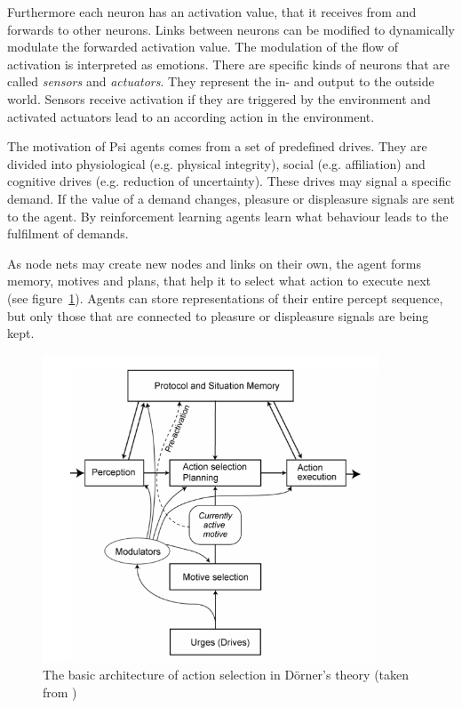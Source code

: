 Furthermore each neuron has an activation value, that it receives from and forwards to other neurons. Links between neurons can be modified to dynamically modulate the forwarded activation value. The modulation of the flow of activation is interpreted as emotions. There are specific kinds of neurons that are called \emph{sensors} and \emph{actuators}. They represent the in- and output to the outside world. Sensors receive activation if they are triggered by the environment and activated actuators lead to an according action in the environment.

The motivation of Psi agents comes from a set of predefined drives. They are divided into physiological (e.g. physical integrity), social (e.g. affiliation) and cognitive drives (e.g. reduction of uncertainty). These drives may signal a specific demand. If the value of a demand changes, pleasure or displeasure signals are sent to the agent. By reinforcement learning agents learn what behaviour leads to the fulfilment of demands. 

As node nets may create new nodes and links on their own, the agent forms memory, motives and plans, that help it to select what action to execute next (see figure~\ref{motive_architecture}). Agents can store representations of their entire percept sequence, but only those that are connected to pleasure or displeasure signals are being kept.

\begin{figure}[h]
  \centering
    \includegraphics[width=10cm]{graphics/motive_architecture}
  \caption[The basic architecture of Psi action selection]{The basic architecture of action selection in Dörner's theory (taken from \cite{Bach:2009:PSI:1611304})}
  \label{motive_architecture}
\end{figure}

